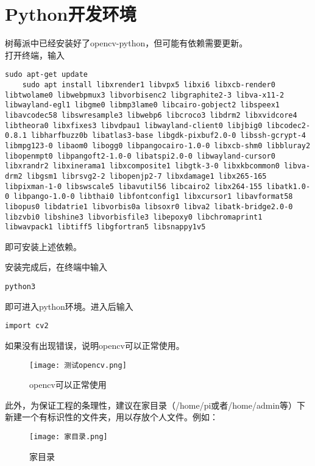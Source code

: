 \section{Python开发环境}
树莓派中已经安装好了opencv-python，但可能有依赖需要更新。\\
打开终端，输入
\begin{lstlisting}[style=bashstyle]
	sudo apt-get update
	sudo apt install libxrender1 libvpx5 libxi6 libxcb-render0 libtwolame0 libwebpmux3 libvorbisenc2 libgraphite2-3 libva-x11-2 libwayland-egl1 libgme0 libmp3lame0 libcairo-gobject2 libspeex1 libavcodec58 libswresample3 libwebp6 libcroco3 libdrm2 libxvidcore4 libtheora0 libxfixes3 libvdpau1 libwayland-client0 libjbig0 libcodec2-0.8.1 libharfbuzz0b libatlas3-base libgdk-pixbuf2.0-0 libssh-gcrypt-4 libmpg123-0 libaom0 libogg0 libpangocairo-1.0-0 libxcb-shm0 libbluray2 libopenmpt0 libpangoft2-1.0-0 libatspi2.0-0 libwayland-cursor0 libxrandr2 libxinerama1 libxcomposite1 libgtk-3-0 libxkbcommon0 libva-drm2 libgsm1 librsvg2-2 libopenjp2-7 libxdamage1 libx265-165 libpixman-1-0 libswscale5 libavutil56 libcairo2 libx264-155 libatk1.0-0 libpango-1.0-0 libthai0 libfontconfig1 libxcursor1 libavformat58 libopus0 libdatrie1 libvorbis0a libsoxr0 libva2 libatk-bridge2.0-0 libzvbi0 libshine3 libvorbisfile3 libepoxy0 libchromaprint1 libwavpack1 libtiff5 libgfortran5 libsnappy1v5
\end{lstlisting}
即可安装上述依赖。
\par
安装完成后，在终端中输入
\begin{lstlisting}[style=bashstyle]
	python3
\end{lstlisting}
即可进入python环境。进入后输入
\begin{lstlisting}[style=pythonstyle]
	import cv2
\end{lstlisting}
\par
如果没有出现错误，说明opencv可以正常使用。
\begin{figure}[H]
	\centering
	\texttt{[image: 测试opencv.png]}
	\caption{opencv可以正常使用}
	\label{fig:example}
\end{figure}
\par
此外，为保证工程的条理性，建议在家目录（/home/pi或者/home/admin等）下新建一个有标识性的文件夹，用以存放个人文件。例如：
\begin{figure}[H]
	\centering
	\texttt{[image: 家目录.png]}
	\caption{家目录}
	\label{fig:example}
\end{figure}
